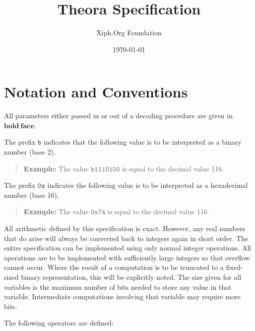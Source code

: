 \documentclass[9pt,letterpaper]{book}
\title{Theora Specification}
\author{Xiph.Org Foundation}
\date{\today}
\newcommand{\bitvar}[1]{\ensuremath{\mathbf{\bm{#1}}}}
\newcommand{\bin}[1]{\ensuremath{\mathtt{b#1}}}
\newcommand{\hex}[1]{\ensuremath{\mathtt{0x#1}}}
\numberwithin{equation}{chapter}
\numberwithin{figure}{chapter}
\numberwithin{table}{chapter}
\begin{document}
\frontmatter

\begin{titlepage}
\maketitle
\end{titlepage}
\thispagestyle{empty}
\cleardoublepage


\thispagestyle{plain}
\tableofcontents
\cleardoublepage

\thispagestyle{plain}
\listoffigures
\cleardoublepage

\thispagestyle{plain}
\listoftables
\cleardoublepage

\thispagestyle{plain}
\chapter*{Notation and Conventions}

All parameters either passed in or out of a decoding procedure are given in
 \bitvar{bold\ face}.

The prefix \bin{} indicates that the following value is to be interpreted as a
 binary number (base 2).
\begin{verse}
{\bf Example:} The value \bin{1110100} is equal to the decimal value 116.
\end{verse}

The prefix \hex{} indicates the following value is to be interpreted as a
 hexadecimal number (base 16).
\begin{verse}
{\bf Example:} The value \hex{74} is equal to the decimal value 116.
\end{verse}

All arithmetic defined by this specification is exact.
However, any real numbers that do arise will always be converted back to
 integers again in short order.
The entire specification can be implemented using only normal integer
 operations.
All operations are to be implemented with sufficiently large integers so that
 overflow cannot occur.
Where the result of a computation is to be truncated to a fixed-sized binary
 representation, this will be explicitly noted.
The size given for all variables is the maximum number of bits needed to store
 any value in that variable.
Intermediate computations involving that variable may require more bits.

The following operators are defined:
\end{document}
